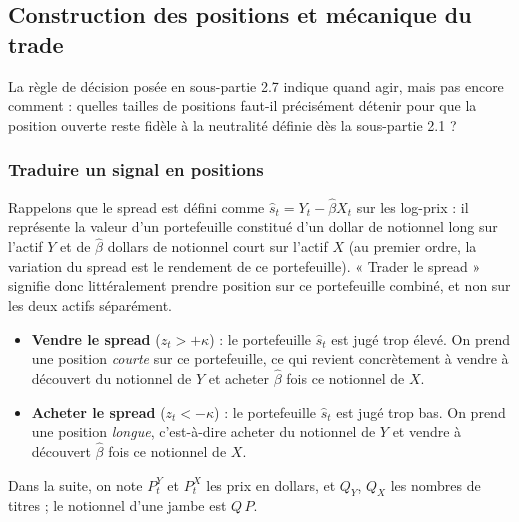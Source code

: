 \documentclass{article}
\begin{document}
\subsection{Construction des positions et mécanique du trade}
La règle de décision posée en sous-partie 2.7 indique quand agir, mais pas encore comment : quelles tailles de positions faut-il précisément détenir pour que la position ouverte reste fidèle à la neutralité définie dès la sous-partie 2.1 ?
\subsubsection*{Traduire un signal en positions}
Rappelons que le spread est défini comme $\hat{s}_t = Y_t - \hat\beta X_t$ sur les log-prix : il représente la valeur d'un portefeuille constitué d'un dollar de notionnel long sur l'actif $Y$ et de $\hat\beta$ dollars de notionnel court sur l'actif $X$ (au premier ordre, la variation du spread est le rendement de ce portefeuille). « Trader le spread » signifie donc littéralement prendre position sur ce portefeuille combiné, et non sur les deux actifs séparément.
\begin{itemize}
\item \textbf{Vendre le spread} ($z_t > +\kappa$) : le portefeuille $\hat{s}_t$ est jugé trop élevé. On prend une position \emph{courte} sur ce portefeuille, ce qui revient concrètement à vendre à découvert du notionnel de $Y$ et acheter $\hat\beta$ fois ce notionnel de $X$.
\item \textbf{Acheter le spread} ($z_t < -\kappa$) : le portefeuille $\hat{s}_t$ est jugé trop bas. On prend une position \emph{longue}, c'est-à-dire acheter du notionnel de $Y$ et vendre à découvert $\hat\beta$ fois ce notionnel de $X$.
\end{itemize}
Dans la suite, on note $P^Y_t$ et $P^X_t$ les prix en dollars, et $Q_Y$, $Q_X$ les nombres de titres ; le notionnel d'une jambe est $Q\,P$.
\end{document}
